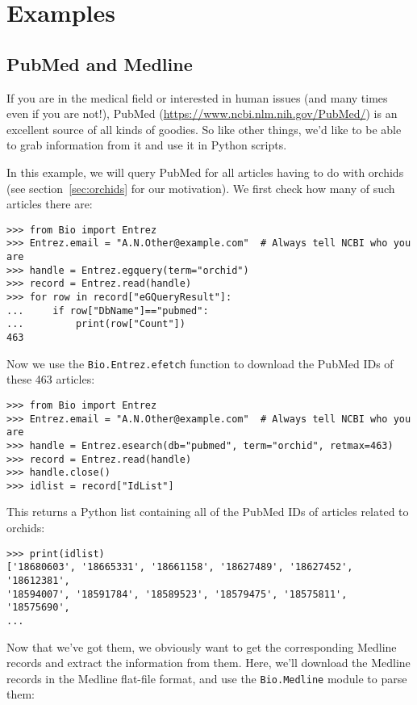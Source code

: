 \section{Examples}
\label{sec:entrez_examples}

\subsection{PubMed and Medline}
\label{sec:pub_med}

If you are in the medical field or interested in human issues (and many times even if you are not!), PubMed (\url{https://www.ncbi.nlm.nih.gov/PubMed/}) is an excellent source of all kinds of goodies. So like other things, we'd like to be able to grab information from it and use it in Python scripts.

In this example, we will query PubMed for all articles having to do with orchids (see section~\ref{sec:orchids} for our motivation). We first check how many of such articles there are:

\begin{verbatim}
>>> from Bio import Entrez
>>> Entrez.email = "A.N.Other@example.com"  # Always tell NCBI who you are
>>> handle = Entrez.egquery(term="orchid")
>>> record = Entrez.read(handle)
>>> for row in record["eGQueryResult"]:
...     if row["DbName"]=="pubmed":
...         print(row["Count"])
463
\end{verbatim}

Now we use the \verb+Bio.Entrez.efetch+ function to download the PubMed IDs of these 463 articles:

\begin{verbatim}
>>> from Bio import Entrez
>>> Entrez.email = "A.N.Other@example.com"  # Always tell NCBI who you are
>>> handle = Entrez.esearch(db="pubmed", term="orchid", retmax=463)
>>> record = Entrez.read(handle)
>>> handle.close()
>>> idlist = record["IdList"]
\end{verbatim}

This returns a Python list containing all of the PubMed IDs of articles related to orchids:
\begin{verbatim}
>>> print(idlist)
['18680603', '18665331', '18661158', '18627489', '18627452', '18612381',
'18594007', '18591784', '18589523', '18579475', '18575811', '18575690',
...
\end{verbatim}

Now that we've got them, we obviously want to get the corresponding Medline records and extract the information from them. Here, we'll download the Medline records in the Medline flat-file format, and use the \verb+Bio.Medline+ module to parse them:

